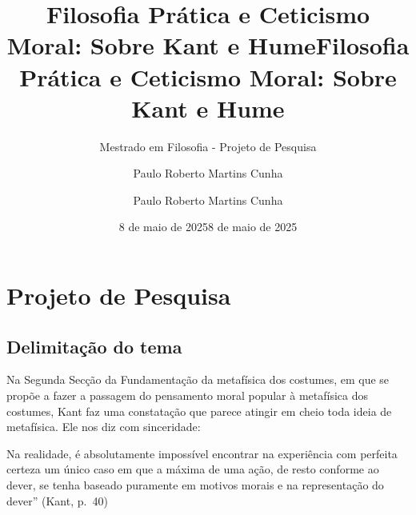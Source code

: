 \documentclass[
  paper=a4,
  twoside  ,captions=tableheading
]{scrbook}
\title{Filosofia Prática e Ceticismo Moral: Sobre Kant e Hume}
\subtitle{Mestrado em Filosofia - Projeto de Pesquisa}
\author{Paulo Roberto Martins Cunha}
\date{8 de maio de 2025}
\title{Filosofia Prática e Ceticismo Moral: Sobre Kant e Hume}
\author{Paulo Roberto Martins Cunha}
\date{8 de maio de 2025}
\renewcommand*\contentsname{Índice}
\newcommand\contentsname{Índice}
\renewenvironment{quote}{\begin{customblockquote}\list{}{\rightmargin=0em\leftmargin=0em}%
\item\relax\color{blockquote-text}\ignorespaces}{\unskip\unskip\endlist\end{customblockquote}}
\begin{document}
\begin{titlepage}
\newcommand{\colorRule}[3][black]{\textcolor[HTML]{#1}{\rule{#2}{#3}}}
\end{titlepage}
\restoregeometry
{}



\setcounter{chapter}{1}
\addtocounter{chapter}{-1}

\renewcommand*\contentsname{Índice}
{
\hypersetup{linkcolor=}
\setcounter{tocdepth}{3}
\tableofcontents
\newpage
}
\section{Projeto de Pesquisa}\label{projeto-de-pesquisa}

\subsection{Delimitação do tema}\label{delimitauxe7uxe3o-do-tema}

Na Segunda Secção da Fundamentação da metafísica dos costumes, em que se
propõe a fazer a passagem do pensamento moral popular à metafísica dos
costumes, Kant faz uma constatação que parece atingir em cheio toda
ideia de metafísica. Ele nos diz com sinceridade:

\begin{quote}
Na realidade, é absolutamente impossível encontrar na experiência com
perfeita certeza um único caso em que a máxima de uma ação, de resto
conforme ao dever, se tenha baseado puramente em motivos morais e na
representação do dever'' (Kant, p.~40)
\end{quote}
\end{document}
